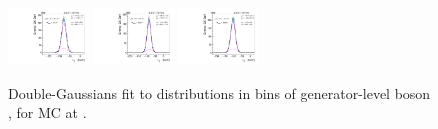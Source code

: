 \begin{figure}[htb]
\includegraphics[width=0.19\textwidth]{plots/Appendix_Recoil_Fits/WmpMC_PF_5TeV_2G/pfu1fit_32.pdf}
\includegraphics[width=0.19\textwidth]{plots/Appendix_Recoil_Fits/WmpMC_PF_5TeV_2G/pfu1fit_33.pdf}
\includegraphics[width=0.19\textwidth]{plots/Appendix_Recoil_Fits/WmpMC_PF_5TeV_2G/pfu1fit_34.pdf}
\caption{Double-Gaussians fit to \upar distributions in bins of generator-level boson \pt, for \Wp MC at \serag.}
\label{fig:a:recoil:fit:wp:u1:5}
\end{figure}